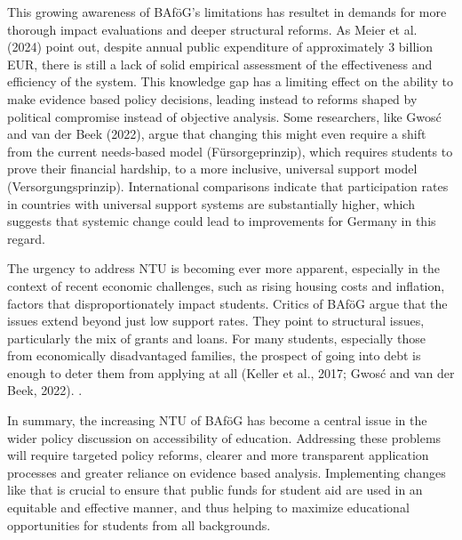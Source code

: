 This growing awareness of BAföG’s limitations has resultet in demands for more thorough impact evaluations and deeper structural reforms. As Meier et al. (2024) point out, despite annual public expenditure of approximately 3 billion EUR, there is still a lack of solid empirical assessment of the effectiveness and efficiency of the system. This knowledge gap has a limiting effect on the ability to make evidence based policy decisions, leading instead to reforms shaped by political compromise instead of objective analysis. Some researchers, like Gwosć and van der Beek (2022), argue that changing this might even require a shift from the current needs-based model (Fürsorgeprinzip), which requires students to prove their financial hardship, to a more inclusive, universal support model (Versorgungsprinzip). International comparisons indicate that participation rates in countries with universal support systems are substantially higher, which suggests that systemic change could lead to improvements for Germany in this regard.

The urgency to address NTU is becoming ever more apparent, especially in the context of recent economic challenges, such as rising housing costs and inflation, factors that disproportionately impact students. Critics of BAföG argue that the issues extend beyond just low support rates. They point to structural issues, particularly the mix of grants and loans. For many students, especially those from economically disadvantaged families, the prospect of going into debt is enough to deter them from applying at all (Keller et al., 2017; Gwosć and van der Beek, 2022).
\citep{gwosc_krisenbewaltigung_2022}.

In summary, the increasing NTU of BAföG has become a central issue in the wider policy discussion on accessibility of education. Addressing these problems will require targeted policy reforms, clearer and more transparent application processes and greater reliance on evidence based analysis. Implementing changes like that is crucial to ensure that public funds for student aid are used in an equitable and effective manner, and thus helping to maximize educational opportunities for students from all backgrounds.
